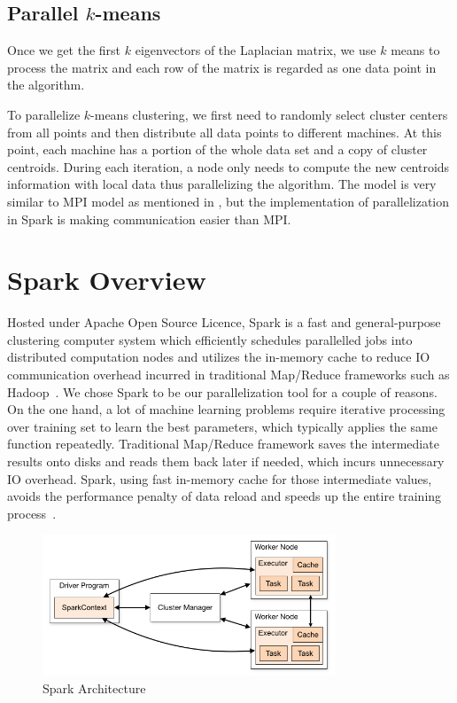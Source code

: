 \documentclass{acm_proc_article-sp}
\begin{document}
\subsection{Parallel $k$-means}
Once we get the first $k$ eigenvectors of the Laplacian matrix, we use $k$ means to process the matrix and each row of the matrix is regarded as one data point in the algorithm.

To parallelize $k$-means clustering, we first need to randomly select cluster centers from all points and then distribute all data points to different machines. At this point, each machine has a portion of the whole data set and a copy of cluster centroids. During each iteration, a node only needs to compute the new centroids information with local data thus parallelizing the algorithm. The model is very similar to MPI model as mentioned in \cite{chen2011parallel}, but the implementation of parallelization in Spark is making communication easier than MPI.


\section{Spark Overview}
Hosted under Apache Open Source Licence, Spark is a fast and general-purpose clustering computer system which efficiently schedules parallelled jobs into distributed computation nodes and utilizes the in-memory cache to reduce IO communication overhead incurred in traditional Map/Reduce frameworks such as Hadoop~\cite{zaharia2010spark}. We chose Spark to be our parallelization tool for a couple of reasons. On the one hand, a lot of machine learning problems require iterative processing over training set to learn the best parameters, which typically applies the same function repeatedly. Traditional Map/Reduce framework saves the intermediate results onto disks and reads them back later if needed, which incurs unnecessary IO overhead. Spark, using fast in-memory cache for those intermediate values, avoids the performance penalty of data reload and speeds up the entire training process~\cite{zaharia2010spark}.

\begin{figure}[h]
\includegraphics[height=4.2cm]{spark_architecture.png}
\caption{Spark Architecture~\cite{sparkoverview}}
\label{spark_arch}
\end{figure}
\end{document}
